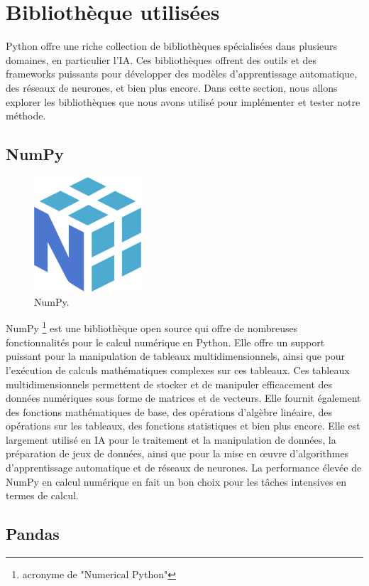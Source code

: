 \section{Bibliothèque utilisées}
Python offre une riche collection de bibliothèques spécialisées dans plusieurs
domaines, en particulier l'IA. Ces bibliothèques offrent des outils et des
frameworks puissants pour développer des modèles d'apprentissage automatique,
des réseaux de neurones, et bien plus encore. Dans cette section, nous allons
explorer les bibliothèques que nous avons utilisé pour implémenter et tester
notre méthode.
\subsection{NumPy}

\begin{figure}[hbt!]
  \centering
  \includegraphics[width=4cm]{images_pfe/numpy.png}
  \caption{NumPy.}
  \label{fig:numpy}
\end{figure}
\FloatBarrier
\medskip

NumPy \footnote{acronyme de "Numerical Python"} est une bibliothèque open
source qui offre de nombreuses fonctionnalités pour le calcul numérique en
Python. Elle offre un support puissant pour la manipulation de tableaux
multidimensionnels, ainsi que pour l'exécution de calculs mathématiques
complexes sur ces tableaux. Ces tableaux multidimensionnels permettent de
stocker et de manipuler efficacement des données numériques sous forme de
matrices et de vecteurs. Elle fournit également des fonctions mathématiques de
base, des opérations d'algèbre linéaire, des opérations sur les tableaux, des
fonctions statistiques et bien plus encore. Elle est largement utilisé en IA
pour le traitement et la manipulation de données, la préparation de jeux de
données, ainsi que pour la mise en œuvre d'algorithmes d'apprentissage
automatique et de réseaux de neurones. La performance élevée de NumPy en calcul
numérique en fait un bon choix pour les tâches intensives en termes de calcul.

\subsection{Pandas}

